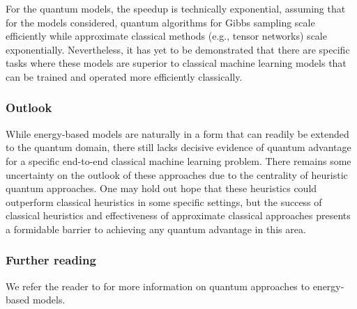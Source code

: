 \begin{refsection}
For the quantum models, the speedup is technically exponential, assuming that for the models considered, quantum algorithms for Gibbs sampling scale efficiently while approximate classical methods (e.g., tensor networks) scale exponentially. Nevertheless, it has yet to be demonstrated that there are specific tasks where these models are superior to classical machine learning models that can be trained and operated more efficiently classically. 

\subsubsection*{Outlook}
While energy-based models are naturally in a form that can readily be extended to the quantum domain, there still lacks decisive evidence of quantum advantage for a specific end-to-end classical machine learning problem. There remains some uncertainty on the outlook of these approaches due to the centrality of heuristic quantum approaches. One may hold out hope that these heuristics could outperform classical heuristics in some specific settings, but the success of classical heuristics and effectiveness of approximate classical approaches presents a formidable barrier to achieving any quantum advantage in this area.

\subsubsection*{Further reading}

We refer the reader to \cite{schuld2021machineLearning} for more information on quantum approaches to energy-based models. 

\printbibliography[heading=secbib,segment=\therefsegment]
\end{refsection}

\newpage



